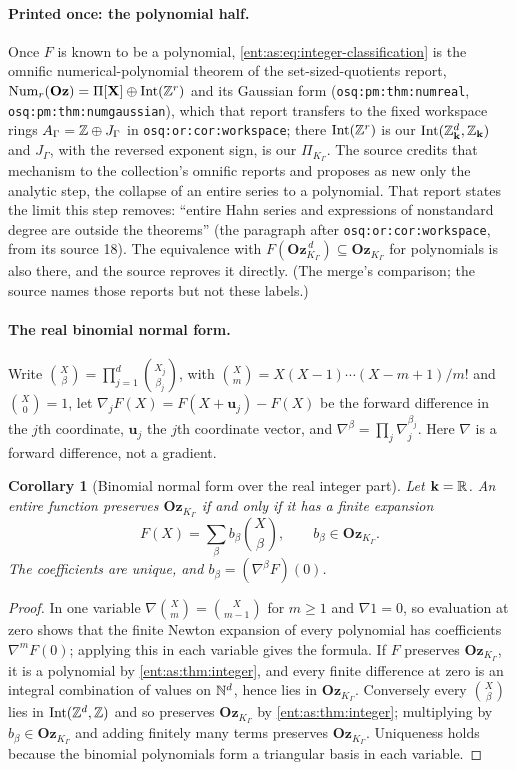 \documentclass[11pt]{article}
\theoremstyle{plain}
\theoremstyle{plain}
\theoremstyle{plain}
\newtheorem{corollary}[corollary]{Corollary}
\theoremstyle{definition}
\theoremstyle{definition}
\theoremstyle{definition}
\theoremstyle{definition}
\theoremstyle{remark}
\newcommand{\K}{K_\Gamma}\newcommand{\KD}{K_\Delta}
\newcommand{\kk}{\mathbf k}\newcommand{\PP}{\mathbb P}
\newcommand{\Oz}{\mathbf{Oz}}\newcommand{\Ed}{\mathcal E_{\Gamma,d}}
\newcommand{\Zk}{\Z_{\kk}}\newcommand{\OzK}{\Oz_{\K}}
\newcommand{\PiK}{\Pi_{\K}}\newcommand{\pg}{\mathsf p}
\DeclareMathOperator{\Int}{Int}\DeclareMathOperator{\ct}{ct}
\begin{document}
\paragraph{Printed once: the polynomial half.} Once $F$ is known to be a
polynomial, \eqref{ent:as:eq:integer-classification} is the omnific
numerical-polynomial theorem of the set-sized-quotients report,
$\operatorname{Num}_r(\Oz)=\Pi[\mathbf X]\oplus\Int(\Z^r)$ and its Gaussian form
(\texttt{osq:pm:thm:numreal}, \texttt{osq:pm:thm:numgaussian}), which that report
transfers to the fixed workspace rings $A_\Gamma=\mathbb Z\oplus J_\Gamma$ in
\texttt{osq:or:cor:workspace}; there $\Int(\Z^r)$ is our $\Int(\Zk^d,\Zk)$ and
$J_\Gamma$, with the reversed exponent sign, is our $\PiK$. The source credits
that mechanism to the collection's omnific reports and proposes as new only
the analytic step, the collapse of an entire series to a polynomial. That
report states the limit this step removes: ``entire Hahn series and
expressions of nonstandard degree are outside the theorems'' (the paragraph
after \texttt{osq:or:cor:workspace}, from its source 18). The equivalence with
$F(\OzK^{\,d})\subseteq\OzK$ for polynomials is also there, and the source
reproves it directly. (The merge's comparison; the source names
those reports but not these labels.)

\paragraph{The real binomial normal form.} Write
$\binom{X}{\beta}=\prod_{j=1}^d\binom{X_j}{\beta_j}$, with
$\binom{X}{m}=X(X-1)\cdots(X-m+1)/m!$ and $\binom X0=1$, let
$\nabla_jF(X)=F(X+\mathbf u_j)-F(X)$ be the forward difference in the $j$th
coordinate, $\mathbf u_j$ the $j$th coordinate vector, and
$\nabla^\beta=\prod_j\nabla_j^{\beta_j}$. Here $\nabla$ is a forward
difference, not a gradient.

\begin{corollary}[Binomial normal form over the real integer part]
\label{ent:as:cor:binomial}
Let $\kk=\R$. An entire function preserves $\OzK$ if and only if it has a
finite expansion
\begin{equation}\label{ent:as:eq:binomial}
 F(X)=\sum_\beta b_\beta\binom X\beta,\qquad b_\beta\in\OzK .
\end{equation}
The coefficients are unique, and $b_\beta=(\nabla^\beta F)(0)$.
\end{corollary}
\begin{proof}
In one variable $\nabla\binom Xm=\binom X{m-1}$ for $m\ge1$ and $\nabla1=0$, so
evaluation at zero shows that the finite Newton expansion of every polynomial
has coefficients $\nabla^mF(0)$; applying this in each variable gives the
formula. If $F$ preserves $\OzK$, it is a polynomial by
\cref{ent:as:thm:integer}, and every finite difference at zero is an integral
combination of values on $\mathbb N^d$, hence lies in $\OzK$. Conversely every
$\binom X\beta$ lies in $\Int(\Z^d,\Z)$ and so preserves $\OzK$ by
\cref{ent:as:thm:integer}; multiplying by $b_\beta\in\OzK$ and adding finitely
many terms preserves $\OzK$. Uniqueness holds because the binomial polynomials
form a triangular basis in each variable.
\end{proof}
\end{document}
